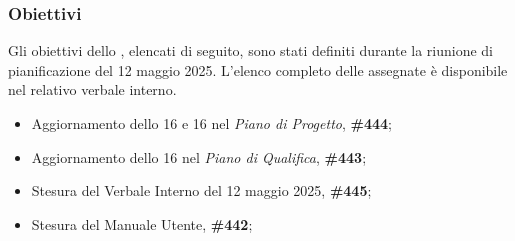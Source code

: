 \subsubsection{Obiettivi}
\label{sec:obiettivi_sprint16}

Gli obiettivi dello , elencati di seguito, sono stati definiti durante la riunione di pianificazione del 12 maggio 2025.
L'elenco completo delle  assegnate è disponibile nel relativo verbale interno.

\begin{itemize}
    \item Aggiornamento dello  16 e 16 nel \textit{Piano di Progetto},  \textbf{\#444};
    \item Aggiornamento dello  16 nel \textit{Piano di Qualifica},  \textbf{\#443};
    \item Stesura del Verbale Interno del 12 maggio 2025,  \textbf{\#445};
    \item Stesura del Manuale Utente,  \textbf{\#442};
\end{itemize}
